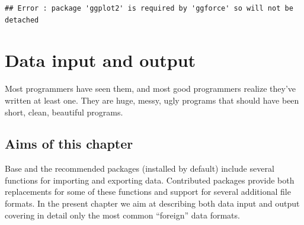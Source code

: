 \documentclass[krantz2]{krantz}\usepackage{knitr}%
\begin{document}
\begin{knitrout}\footnotesize
{}\color{fgcolor}\begin{kframe}
\begin{alltt}
\hlstd{(}\hlopt{:}
\hlstd{(}\hlopt{:}
\hlstd{(}\hlopt{:}
\hlstd{(}\hlopt{:}
\end{alltt}
\begin{verbatim}
## Error : package 'ggplot2' is required by 'ggforce' so will not be detached
\end{verbatim}
\begin{alltt}
\hlstd{(}\hlopt{:}
\hlstd{(}\hlopt{:}
\end{alltt}
\end{kframe}
\end{knitrout}







\chapter{Data input and output}\label{chap:R:data:io}\label{sec:data:io}

\begin{VF}
Most programmers have seen them, and most good programmers realize they've written at least one. They are huge, messy, ugly programs that should have been short, clean, beautiful programs.

\end{VF}



\section{Aims of this chapter}

Base \Rlang and the recommended packages (installed by default) include several functions for importing and exporting data. Contributed packages provide both replacements for some of these functions and support for several additional file formats. In the present chapter we aim at describing both data input and output covering in detail only the most common ``foreign'' data formats.
\end{document}
